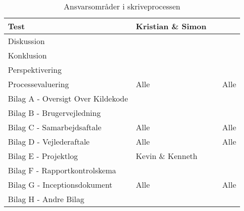\begin{table}[H]
\begin{tabularx}{\textwidth}{|p{7cm}|X|X|X|}
        \hline
        Test                                & Kristian \& Simon &  &  \\
        \hline
        Diskussion                          &  &  &  \\
        \hline
        Konklusion                          &  &  &  \\
        \hline
        Perspektivering                     &  &  &  \\
        \hline
        Processevaluering                   & Alle &  & Alle \\
        \hline
        Bilag A - Oversigt Over Kildekode   &  &  &  \\
        \hline
        Bilag B - Brugervejledning          &  &  &  \\
        \hline
        Bilag C - Samarbejdsaftale          & Alle &  & Alle\\
        \hline
        Bilag D - Vejlederaftale            & Alle &  & Alle\\
        \hline
        Bilag E - Projektlog  & Kevin \& Kenneth &  & \\
        \hline
        Bilag F - Rapportkontrolskema       &  &  &  \\
        \hline
        Bilag G - Inceptionsdokument        & Alle &  & Alle \\
        \hline
        Bilag H - Andre Bilag               &  &  &  \\
        \hline
    \end{tabularx}
    \caption{Ansvarsområder i skriveprocessen}
    \label{tab:redaktionelt}
\end{table}